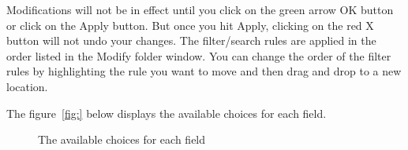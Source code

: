 Modifications will not be in effect until you click on the green arrow OK button or click on the Apply button.  
But once you hit Apply, clicking on the red X button will not undo your changes.  
The filter/search rules are applied in the order listed in the Modify folder window.  
You can change the order of the filter rules by highlighting the rule you want to move and then drag and drop to a new location.

The figure~\ref{fig:} below displays the available choices for each field.

\begin{figure}[htpb]
    \centering
    \caption{The available choices for each field}
    \label{fig:modify_folder}
\end{figure}


